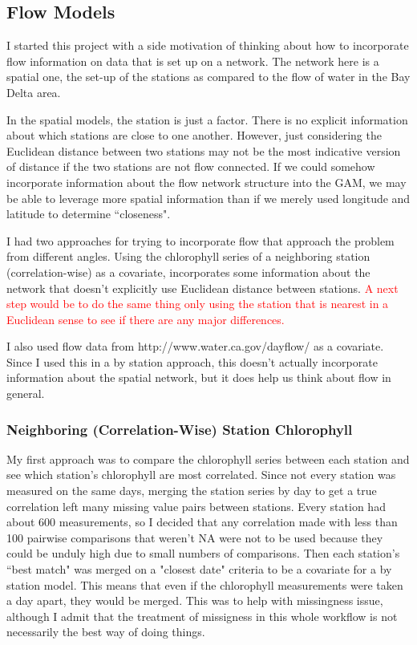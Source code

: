 \documentclass[12pt]{amsart}
\begin{document}
\subsection{Flow Models}

I started this project with a side motivation of thinking about how to incorporate flow information on data that is set up on a network. The network here is a spatial one, the set-up of the stations as compared to the flow of water in the Bay Delta area.

In the spatial models, the station is just a factor. There is no explicit information about which stations are close to one another. However, just considering the Euclidean distance between two stations may not be the most indicative version of distance if the two stations are not flow connected. If we could somehow incorporate information about the flow network structure into the GAM, we may be able to leverage more spatial information than if we merely used longitude and latitude to determine ``closeness".

I had two approaches for trying to incorporate flow that approach the problem from different angles. Using the chlorophyll series of a neighboring station (correlation-wise) as a covariate, incorporates some information about the network that doesn't explicitly use Euclidean distance between stations. \textcolor{red}{A next step would be to do the same thing only using the station that is nearest in a Euclidean sense to see if there are any major differences.}

I also used flow data from http://www.water.ca.gov/dayflow/ as a covariate. Since I used this in a by station approach, this doesn't actually incorporate information about the spatial network, but it does help us think about flow in general. 



\subsubsection{Neighboring (Correlation-Wise) Station Chlorophyll}

My first approach was to compare the chlorophyll series between each station and see which station's chlorophyll are most correlated. Since not every station was measured on the same days, merging the station series by day to get a true correlation left many missing value pairs between stations. Every station had about 600 measurements, so I decided that any correlation made with less than 100 pairwise comparisons that weren't NA were not to be used because they could be unduly high due to small numbers of comparisons. Then each station's ``best match" was merged on a "closest date" criteria to be a covariate for a by station model. This means that even if the chlorophyll measurements were taken a day apart, they would be merged. This was to help with missingness issue, although I admit that the treatment of missigness in this whole workflow is not necessarily the best way of doing things.
\end{document}
